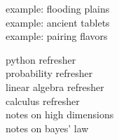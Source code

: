 \documentclass[11pt, justified]{tufte-book}
\newcommand{\phdot}{\phantom{.}}
\theoremstyle{definition}
\begin{document}
{\begin{description}
\begin{description}
          \item[example: flooding plains] \phdot
          \item[example: ancient tablets] \phdot
          \item[example: pairing flavors] \phdot
        \end{description}
      \item[G. Appendices] \phdot 
        \begin{description}
          \item[python refresher] \phdot
          \item[probability refresher] \phdot
          \item[linear algebra refresher] \phdot
          \item[calculus refresher] \phdot
          \item[notes on high dimensions] \phdot
          \item[notes on bayes' law] \phdot
        \end{description}
    \end{description}
  }
\end{document}
